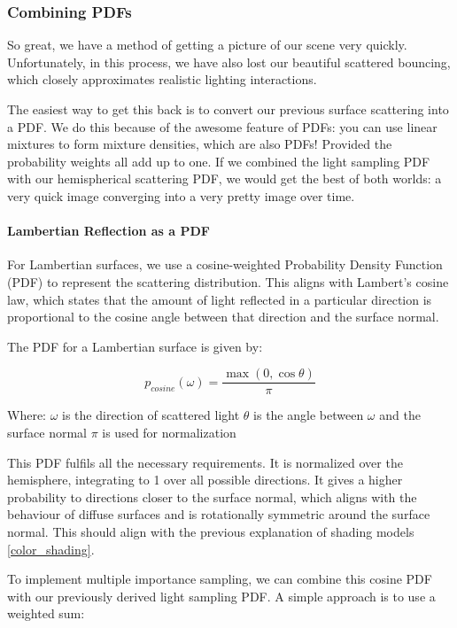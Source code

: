 \documentclass[12pt]{article}
\begin{document}
\subsubsection{Combining PDFs}

So great, we have a method of getting a picture of our scene very quickly. Unfortunately, in this process, we have also lost our beautiful scattered bouncing, which closely approximates realistic lighting interactions.

The easiest way to get this back is to convert our previous surface scattering into a PDF. We do this because of the awesome feature of PDFs: you can use linear mixtures to form mixture densities, which are also PDFs! Provided the probability weights all add up to one. If we combined the light sampling PDF with our hemispherical scattering PDF, we would get the best of both worlds: a very quick image converging into a very pretty image over time.


\paragraph{Lambertian Reflection as a PDF}

For Lambertian surfaces, we use a cosine-weighted Probability Density Function (PDF) to represent the scattering distribution. This aligns with Lambert's cosine law, which states that the amount of light reflected in a particular direction is proportional to the cosine angle between that direction and the surface normal.

The PDF for a Lambertian surface is given by:

$$p_{cosine}(\omega) = \frac{\max(0, \cos\theta)}{\pi}$$

Where:
$\omega$ is the direction of scattered light
$\theta$ is the angle between $\omega$ and the surface normal
$\pi$ is used for normalization

This PDF fulfils all the necessary requirements. It is normalized over the hemisphere, integrating to 1 over all possible directions. It gives a higher probability to directions closer to the surface normal, which aligns with the behaviour of diffuse surfaces and is rotationally symmetric around the surface normal. This should align with the previous explanation of shading models \ref{color_shading}.

To implement multiple importance sampling, we can combine this cosine PDF with our previously derived light sampling PDF. A simple approach is to use a weighted sum:
\end{document}
